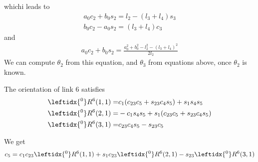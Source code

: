 \documentclass{article}
\begin{document}
whichi leads to
\begin{align}
	a_0c_2+b_0s_2=l_2-(l_3+l_4)s_3\\
	b_0c_2-a_0s_2 = (l_3+l_4)c_3
\end{align}
and
\begin{align}
	a_0c_2+b_0s_2 = \frac{a_0^2 + b_0^2 - l_2^2 - (l_3 + l_4)^2}{2l_2}
\end{align}
We can compute $\theta_2$ from this equation, and $\theta_3$ from equations above, once $\theta_2$ is known.

The orientation of link 6 satisfies
\begin{align}
	\leftidx{^0}R^6(1,1) = &c_1(c_{23}c_5 + s_{23}c_4s_5) + s_1s_4s_5\\
	\leftidx{^0}R^6(2,1) = &-c_1s_4s_5 + s_1(c_{23}c_5 + s_{23}c_4s_5)\\
	\leftidx{^0}R^6(3,1) = &c_{23}c_4s_5 - s_{23}c_5
\end{align}

We get
\begin{align}
	c_5 = c_1c_{23}\leftidx{^0}R^6(1,1) + s_1c_{23}\leftidx{^0}R^6(2,1)-s_{23}\leftidx{^0}R^6(3,1)
\end{align}
\end{document}
